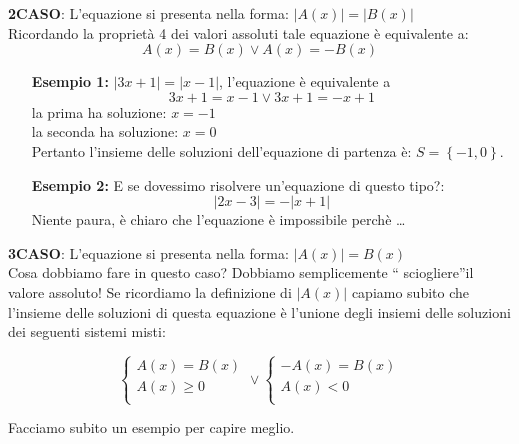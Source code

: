 \textbf{2\textdegree CASO}: L'equazione si presenta nella forma:  
$|A(x)|=|B(x)|$\\
Ricordando la proprietà 4 dei valori assoluti tale equazione è equivalente a:
$$A(x)=B(x) \vee A(x)=-B(x)$$
\begin{enumerate}
        \item [\textbf{Esempio 1:}] $|3x+1|=|x-1|$, l'equazione è equivalente a
        $$3x+1=x-1 \vee 3x+1=-x+1$$
                la prima ha soluzione: $x=-1$\\
                la seconda ha soluzione: $x=0$\\
                Pertanto l'insieme delle soluzioni dell'equazione di partenza 
è: 
$S=\left\lbrace -1,0 \right\rbrace $. 
                
        \item [\textbf{Esempio 2:}] E se dovessimo risolvere un'equazione di 
questo tipo?:
        $$|2x-3|=-|x+1|$$
        Niente paura, è chiaro che l'equazione è impossibile perchè \dots
\end{enumerate}

\textbf{3\textdegree CASO}: L'equazione si presenta nella forma:  
$|A(x)|=B(x)$\\
Cosa dobbiamo fare in questo caso? Dobbiamo semplicemente \textquotedblleft 
sciogliere\textquotedblright il valore assoluto!
Se ricordiamo la definizione di $|A(x)|$ capiamo subito che l'insieme delle 
soluzioni di questa equazione è l'unione degli insiemi delle soluzioni dei 
seguenti sistemi misti:

$$
\left\lbrace 
\begin{array}{l}
A(x)=B(x)\\
A(x)\geq 0\\
\end{array}
\right.
\vee
\left\lbrace 
\begin{array}{l}
-A(x)=B(x)\\
A(x)< 0\\
\end{array}
\right.
$$

Facciamo subito un esempio per capire meglio.

